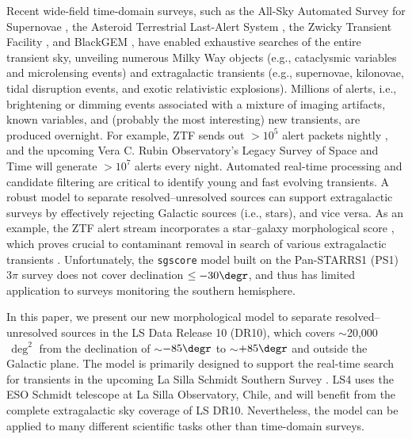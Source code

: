 \documentclass[twocolumn]{aastex631}
\newcommand{\dr}[1]{DR{#1}}
\begin{document}
\begin{CJK*}{UTF8}{gbsn}
Recent wide-field time-domain surveys, such as the All-Sky Automated Survey for Supernovae \citep{ASASSN_2014}, the Asteroid Terrestrial Last-Alert
System \citep{ATLAS_2011, ATLAS_2018},
the Zwicky Transient Facility \citep[ZTF;][]{ZTF_2019a, ZTF_2019b, ZTF_2020}, and BlackGEM \citep{BlackGEM_2024}, have enabled exhaustive searches of the entire transient sky, unveiling numerous Milky Way objects (e.g., cataclysmic variables and microlensing events) and extragalactic transients (e.g., supernovae, kilonovae, tidal disruption events, and exotic relativistic explosions). Millions of alerts, i.e., brightening or dimming events associated with a mixture of imaging artifacts, known variables, and (probably the most interesting) new transients, are produced overnight. For example, ZTF sends out $>$$10^5$ alert packets nightly \citep{ZTF_data_2019, ZTF_ML_2019}, and the upcoming Vera C. Rubin Observatory's Legacy Survey of Space and Time \citep[LSST;][]{LSST_2019} will generate $>$$10^7$ alerts every night. 
Automated real-time processing and candidate filtering are critical to identify young and fast evolving transients. A robust model to separate resolved--unresolved sources can support extragalactic surveys by effectively rejecting Galactic sources (i.e., stars), and vice versa. As an example, the ZTF alert stream incorporates a star--galaxy morphological score \citep[\texttt{sgscore};][ henceforth]{Tachibana_2018}, which proves crucial to contaminant removal in search of various extragalactic transients \citep[e.g.,][]{De_CLU_2020, BTS_I_2020, BTS_II_2020, ZTF_TDE_2021, Rehemtulla_2024}. Unfortunately, the \texttt{sgscore} model built on the Pan-STARRS1 (PS1) 3$\pi$ survey \citep{PanSTARRS_2016} does not cover declination $\le-30\degr$, and thus has limited application to surveys monitoring the southern hemisphere.

In this paper, we present our new morphological model to separate resolved--unresolved sources in the LS Data Release 10 (\dr{10}), which covers $\sim$20,000$\,\deg^2$ from the declination of $\sim$$-85\degr$ to $\sim$$+85\degr$ and outside the Galactic plane. The model is primarily designed to support the real-time search for transients in the upcoming La Silla Schmidt Southern Survey \citep{LS4_2025}. LS4 uses the ESO Schmidt telescope at La Silla Observatory, Chile, and will benefit from the complete extragalactic sky coverage of LS \dr{10}. Nevertheless, the model can be applied to many different scientific tasks other than time-domain surveys.


\end{CJK*}
\end{document}
